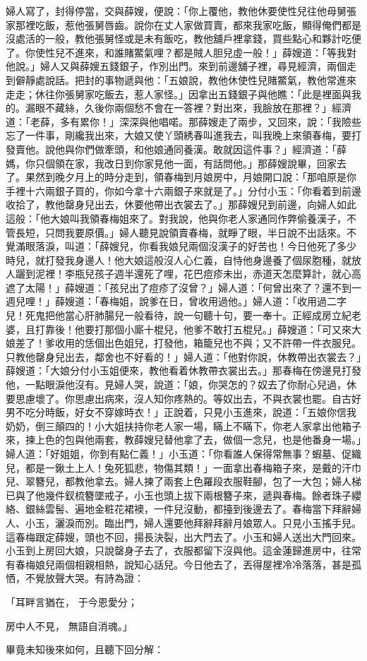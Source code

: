 \begin{showcontents}{}
婦人寫了，封得停當，交與薛嫂，便說：「你上覆他，教他休要使性兒往他母舅張家那裡吃飯，惹他張舅唇齒。說你在丈人家做買賣，都來我家吃飯，顯得俺們都是沒處活的一般，教他張舅怪或是未有飯吃，教他舖戶裡拿錢，買些點心和夥計吃便了。你使性兒不進來，和誰賭鱉氣哩？都是賊人胆兒虛一般！」薛嫂道：「等我對他說。」婦人又與薛嫂五錢銀子，作別出門。來到前邊舖子裡，尋見經濟，兩個走到僻靜處說話。把封的事物遞與他：「五娘說，教他休使性兒賭鱉氣，教他常進來走走；休往你張舅家吃飯去，惹人家怪。」因拿出五錢銀子與他瞧：「此是裡面與我的。漏眼不藏絲，久後你兩個愁不會在一答裡？對出來，我臉放在那裡？」經濟道：「老薛，多有累你！」深深與他唱喏。那薛嫂走了兩步，又回來，說：「我險些忘了一件事，剛纔我出來，大娘又使丫頭綉春叫進我去，叫我晚上來領春梅，要打發賣他。說他與你們做牽頭，和他娘通同養漢。敢就因這件事？」經濟道：「薛媽，你只個領在家，我改日到你家見他一面，有話問他。」那薛嫂說畢，回家去了。果然到晚夕月上的時分走到，領春梅到月娘房中，月娘開口說：「那咱原是你手裡十六兩銀子買的，你如今拿十六兩銀子來就是了。」分付小玉：「你看着到前邊收拾了，教他罄身兒出去，休要他帶出衣裳去了。」那薛嫂兒到前邊，向婦人如此這般：「他大娘叫我領春梅姐來了。對我說，他與你老人家通同作弊偷養漢子，不管長短，只問我要原價。」婦人聽見說領賣春梅，就睜了眼，半日說不出話來。不覺滿眼落淚，叫道：「薛嫂兒，你看我娘兒兩個沒漢子的好苦也！今日他死了多少時兒，就打發我身邊人！他大娘這般沒人心仁義，自恃他身邊養了個尿胞種，就放人躧到泥裡！李瓶兒孩子週半還死了哩，花巴痘疹未出，赤道天怎麼算計，就心高遮了太陽！」薛嫂道：「孩兒出了痘疹了沒曾？」婦人道：「何曾出來了？還不到一週兒哩！」薛嫂道：「春梅姐，說爹在日，曾收用過他。」婦人道：「收用過二字兒！死鬼把他當心肝肺腸兒一般看待，說一句聽十句，要一奉十。正經成房立紀老婆，且打靠後！他要打那個小廝十棍兒，他爹不敢打五棍兒。」薛嫂道：「可又來大娘差了！爹收用的恁個出色姐兒，打發他，箱籠兒也不與；又不許帶一件衣服兒。只教他罄身兒出去，鄰舍也不好看的！」婦人道：「他對你說，休教帶出衣裳去？」薛嫂道：「大娘分付小玉姐便來，教他看着休教帶衣裳出去。」那春梅在傍邊見打發他，一點眼淚他沒有。見婦人哭，說道：「娘，你哭怎的？奴去了你耐心兒過，休要思慮壞了。你思慮出病來，沒人知你疼熱的。等奴出去，不與衣裳也罷。自古好男不吃分時飯，好女不穿嫁時衣！」正說着，只見小玉進來，說道：「五娘你信我奶奶，倒三顛四的！小大姐扶持你老人家一場，瞞上不瞞下，你老人家拿出他箱子來，揀上色的包與他兩套，教薛嫂兒替他拿了去，做個一念兒，也是他番身一場。」婦人道：「好姐姐，你到有點仁義！」小玉道：「你看誰人保得常無事？蝦墓、促織兒，都是一鍬土上人！兔死狐悲，物傷其類！」一面拿出春梅箱子來，是戴的汗巾兒、翠簪兒，都教他拿去。婦人揀了兩套上色羅段衣服鞋腳，包了一大包；婦人梯已與了他幾件釵梳簪墜戒子，小玉也頭上拔下兩根簪子來，遞與春梅。餘者珠子纓絡、銀絲雲髻、遍地金粧花裙襖，一件兒沒動，都擡到後邊去了。春梅當下拜辭婦人、小玉，灑淚而別。臨出門，婦人還要他拜辭拜辭月娘眾人。只見小玉搖手兒。這春梅跟定薛嫂，頭也不回，揚長決裂，出大門去了。小玉和婦人送出大門回來。小玉到上房回大娘，只說罄身子去了，衣服都留下沒與他。這金蓮歸進房中，往常有春梅娘兒兩個相親相熱，說知心話兒。今日他去了，丟得屋裡冷冷落落，甚是孤恓，不覺放聲大哭。有詩為證：

「耳畔言猶在，  于今恩愛分；

房中人不見，  無語自消魂。」

畢竟未知後來如何，且聽下回分解：





\end{showcontents}


